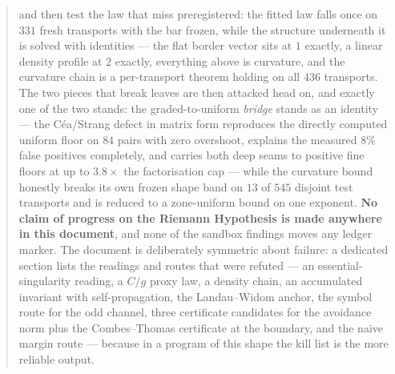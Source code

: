 \documentclass[11pt,a4paper]{article}
\begin{document}
\begin{abstract}
and then test the law that miss preregistered: the fitted law falls once on $331$ fresh transports
with the bar frozen, while the structure underneath it is solved with identities --- the flat
border vector sits at $1$ exactly, a linear density profile at $2$ exactly, everything above is
curvature, and the curvature chain is a per-transport theorem holding on all $436$ transports.
The two pieces that break leaves are then attacked head on, and exactly one of the two stands:
the graded-to-uniform \emph{bridge} stands as an identity --- the C\'ea/Strang defect in matrix
form reproduces the directly computed uniform floor on $84$ pairs with zero overshoot, explains
the measured $8\%$ false positives completely, and carries both deep seams to positive fine
floors at up to $3.8\times$ the factorisation cap --- while the curvature bound honestly breaks
its own frozen shape band on $13$ of $545$ disjoint test transports and is reduced to a
zone-uniform bound on one exponent.
\textbf{No claim of progress on the Riemann Hypothesis is
made anywhere in this document}, and none of the sandbox findings moves any ledger marker. The
document is deliberately symmetric about failure: a dedicated section lists the readings and
routes that were refuted --- an essential-singularity reading, a $C/g$ proxy law, a density chain, an
accumulated invariant with self-propagation, the Landau--Widom anchor, the symbol route for the odd
channel, three certificate candidates for the avoidance norm plus the Combes--Thomas certificate at
the boundary, and the naive margin route --- because in
a program of this shape the kill list is the more reliable output.
\end{abstract}

\TFPTbadges

\end{document}
